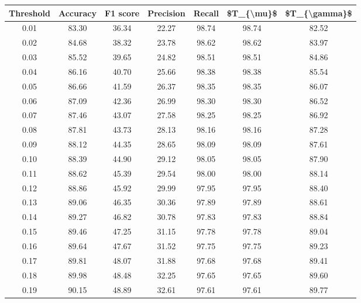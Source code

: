 \begin{tabular}{|c|c|c|c|c|c|c|}
\hline
 Threshold &  Accuracy &  F1 score &  Precision &  Recall &  \$T\_\{\textbackslash mu\}\$ &  \$T\_\{\textbackslash gamma\}\$ \\
\hline
      0.01 &     83.30 &     36.34 &      22.27 &   98.74 &      98.74 &         82.52 \\
      0.02 &     84.68 &     38.32 &      23.78 &   98.62 &      98.62 &         83.97 \\
      0.03 &     85.52 &     39.65 &      24.82 &   98.51 &      98.51 &         84.86 \\
      0.04 &     86.16 &     40.70 &      25.66 &   98.38 &      98.38 &         85.54 \\
      0.05 &     86.66 &     41.59 &      26.37 &   98.35 &      98.35 &         86.07 \\
      0.06 &     87.09 &     42.36 &      26.99 &   98.30 &      98.30 &         86.52 \\
      0.07 &     87.46 &     43.07 &      27.58 &   98.25 &      98.25 &         86.92 \\
      0.08 &     87.81 &     43.73 &      28.13 &   98.16 &      98.16 &         87.28 \\
      0.09 &     88.12 &     44.35 &      28.65 &   98.09 &      98.09 &         87.61 \\
      0.10 &     88.39 &     44.90 &      29.12 &   98.05 &      98.05 &         87.90 \\
      0.11 &     88.62 &     45.39 &      29.54 &   98.00 &      98.00 &         88.14 \\
      0.12 &     88.86 &     45.92 &      29.99 &   97.95 &      97.95 &         88.40 \\
      0.13 &     89.06 &     46.35 &      30.36 &   97.89 &      97.89 &         88.61 \\
      0.14 &     89.27 &     46.82 &      30.78 &   97.83 &      97.83 &         88.84 \\
      0.15 &     89.46 &     47.25 &      31.15 &   97.78 &      97.78 &         89.04 \\
      0.16 &     89.64 &     47.67 &      31.52 &   97.75 &      97.75 &         89.23 \\
      0.17 &     89.81 &     48.07 &      31.88 &   97.68 &      97.68 &         89.41 \\
      0.18 &     89.98 &     48.48 &      32.25 &   97.65 &      97.65 &         89.60 \\
      0.19 &     90.15 &     48.89 &      32.61 &   97.61 &      97.61 &         89.77 \\

\end{tabular}
